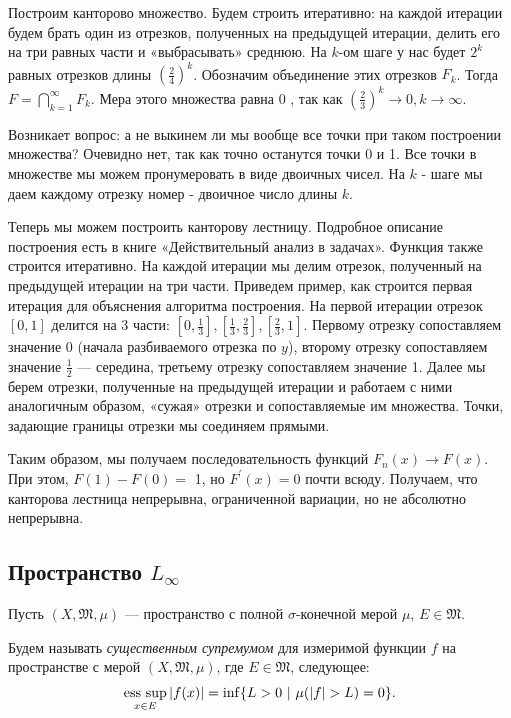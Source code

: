 \begin{example}
    Построим канторово множество. Будем строить итеративно: на каждой итерации будем брать один из отрезков, полученных на предыдущей итерации, делить его на три равных части и «выбрасывать» среднюю. На $k$-ом шаге у нас будет $2^k$ равных отрезков длины $\left(\frac{2}{4}\right)^k$. Обозначим объединение этих отрезков $F_k$. Тогда $F=\bigcap_{k=1}^{\infty} F_k$. Мера этого множества равна 0 , так как $\left(\frac{2}{3}\right)^k \rightarrow 0, k \rightarrow \infty$.

    Возникает вопрос: а не выкинем ли мы вообще все точки при таком построении множества? Очевидно нет, так как точно останутся точки 0 и 1. Все точки в множестве мы можем пронумеровать в виде двоичных чисел. На $k$ - шаге мы даем каждому отрезку номер - двоичное число длины $k$.

    Теперь мы можем построить канторову лестницу. Подробное описание построения есть в книге «Действительный анализ в задачах». Функция также строится итеративно. На каждой итерации мы делим отрезок, полученный на предыдущей итерации на три части. Приведем пример, как строится первая итерация для объяснения алгоритма построения. На первой итерации отрезок $[0,1]$ делится на 3 части: $\left[0, \frac{1}{3}\right],\left[\frac{1}{3}, \frac{2}{3}\right],\left[\frac{2}{3}, 1\right]$. Первому отрезку сопоставляем значение 0 (начала разбиваемого отрезка по $y$), второму отрезку сопоставляем значение $\frac{1}{2}$ — середина, третьему отрезку сопоставляем значение 1. Далее мы берем отрезки, полученные на предыдущей итерации и работаем с ними аналогичным образом, «сужая» отрезки и сопоставляемые им множества. Точки, задающие границы отрезки мы соединяем прямыми.

    Таким образом, мы получаем последовательность функций $F_n(x) \rightarrow F(x)$. При этом, $F(1)-F(0)=$ 1, но $F^{\prime}(x)=0$ почти всюду. Получаем, что канторова лестница непрерывна, ограниченной вариации, но не абсолютно непрерывна.
\end{example}


\subsection{Пространство $L_\infty$}
Пусть $(X, \mathfrak{M}, \mu)$ — пространство с полной $\sigma$-конечной мерой $\mu$, $E \in \mathfrak{M}$.
\begin{definition}
    Будем называть \textit{существенным супремумом} для измеримой функции $f$ на пространстве с мерой $(X, \mathfrak{M}, \mu)$, где $E \in \mathfrak{M}$, следующее:
    \[\operatorname*{ess\ sup}\limits_{x \in E} |f(x)| = \inf\{L > 0 \ | \ \mu(|f| > L) = 0\}.\]
\end{definition} 

